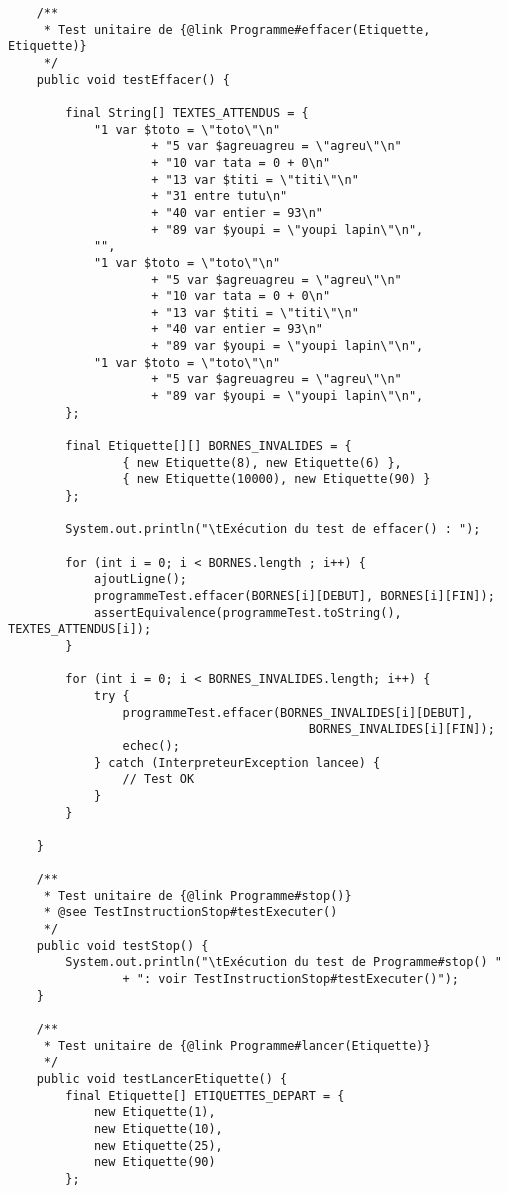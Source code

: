 \begin{enum}
\begin{verbatim}
    /** 
     * Test unitaire de {@link Programme#effacer(Etiquette, Etiquette)}
     */
    public void testEffacer() {
        
        final String[] TEXTES_ATTENDUS = {
            "1 var $toto = \"toto\"\n"
                    + "5 var $agreuagreu = \"agreu\"\n"
                    + "10 var tata = 0 + 0\n"
                    + "13 var $titi = \"titi\"\n"
                    + "31 entre tutu\n"
                    + "40 var entier = 93\n"
                    + "89 var $youpi = \"youpi lapin\"\n",
            "",
            "1 var $toto = \"toto\"\n"
                    + "5 var $agreuagreu = \"agreu\"\n"
                    + "10 var tata = 0 + 0\n"
                    + "13 var $titi = \"titi\"\n"
                    + "40 var entier = 93\n"
                    + "89 var $youpi = \"youpi lapin\"\n",
            "1 var $toto = \"toto\"\n"
                    + "5 var $agreuagreu = \"agreu\"\n"
                    + "89 var $youpi = \"youpi lapin\"\n",
        };
        
        final Etiquette[][] BORNES_INVALIDES = {
                { new Etiquette(8), new Etiquette(6) },
                { new Etiquette(10000), new Etiquette(90) }
        };
        
        System.out.println("\tExécution du test de effacer() : ");
        
        for (int i = 0; i < BORNES.length ; i++) {
            ajoutLigne();
            programmeTest.effacer(BORNES[i][DEBUT], BORNES[i][FIN]);
            assertEquivalence(programmeTest.toString(), TEXTES_ATTENDUS[i]);
        }
        
        for (int i = 0; i < BORNES_INVALIDES.length; i++) {
            try {
                programmeTest.effacer(BORNES_INVALIDES[i][DEBUT], 
                                          BORNES_INVALIDES[i][FIN]);
                echec();
            } catch (InterpreteurException lancee) {
                // Test OK
            }
        }
        
    }
    
    /** 
     * Test unitaire de {@link Programme#stop()}
     * @see TestInstructionStop#testExecuter()
     */
    public void testStop() {
        System.out.println("\tExécution du test de Programme#stop() "
                + ": voir TestInstructionStop#testExecuter()");
    }
    
    /** 
     * Test unitaire de {@link Programme#lancer(Etiquette)}
     */
    public void testLancerEtiquette() {
        final Etiquette[] ETIQUETTES_DEPART = {
            new Etiquette(1),
            new Etiquette(10),
            new Etiquette(25),
            new Etiquette(90)
        };
        

\end{verbatim}
\end{enum}
